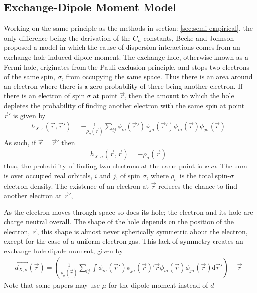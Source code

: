 \documentclass[10pt,a4paper,twocolumn,twoside]{extarticle}
\renewcommand{\d}{\text{d}}
\begin{document}
	\subsection{Exchange-Dipole Moment Model}
	\label{sec:XDM}
	Working on the same principle as the methods in section: \ref{sec:semi-empirical}, the only difference being the derivation of the $C_n$ constants, Becke and Johnson proposed a model\cite{XDM-Original} in which the cause of dispersion interactions comes from an exchange-hole induced dipole moment.\cite{XDM-dipole,XDM-HF,XDM-HigherOrder} The exchange hole, otherwise known as a Fermi hole, originates from the Pauli exclusion principle, and stops two electrons of the same spin, $\sigma$, from occupying the same space. Thus there is an area around an electron where there is a zero probability of there being another electron. If there is an electron of spin $\sigma$ at point $\vec{r}$, then the amount to which the hole depletes the probability of finding another electron with the same spin at point $\vec{r}'$ is given by 
	\begin{align}
		h_{X,\sigma}(\vec{r},\vec{r}') = -\frac{1}{\rho_\sigma(\vec{r})} \sum_{ij} 
										\phi_{i\sigma}(\vec{r}') \phi_{j\sigma}(\vec{r}')
										\phi_{i\sigma}(\vec{r}) \phi_{j\sigma}(\vec{r}) 
	\end{align}
	As such, if $\vec{r} = \vec{r}'$ then 
	\begin{align}
		h_{X,\sigma}(\vec{r}, \vec{r}) = -\rho_\sigma(\vec{r})
	\end{align}
	thus, the probability of finding two electrons at the same point is \emph{zero}.
	The sum is over occupied real orbitals, $i$ and $j$, of spin $\sigma$, where $\rho_\sigma$ is the total spin-$\sigma$ electron density. The existence of an electron at $\vec{r}$ reduces the chance to find another electron at $\vec{r}'$, 

	As the electron moves through space so does its hole; the electron and its hole are charge neutral overall. 
	The shape of the hole depends on the position of the electron, $\vec{r}$, this shape is almost never spherically symmetric about the electron, except for the case of a uniform electron gas. This lack of symmetry creates an exchange hole dipole moment, given by 
	\footnotesize
	\begin{align}
		\label{eq:exchange-dipole}
		\vec{d_{X,\sigma}}(\vec{r}) = \left( \frac{1}{\rho_\sigma(\vec{r})} \sum_{ij}\int
									 \phi_{i\sigma}(\vec{r}') \phi_{j\sigma}(\vec{r})' 
									 \vec{r}\phi_{i\sigma}(\vec{r}) \phi_{j\sigma}(\vec{r}) 
									 \d\vec{r}'\right) - \vec{r}
	\end{align}
	\normalsize
	Note that some papers may use $\mu$ for the dipole moment instead of $d$
\end{document}
